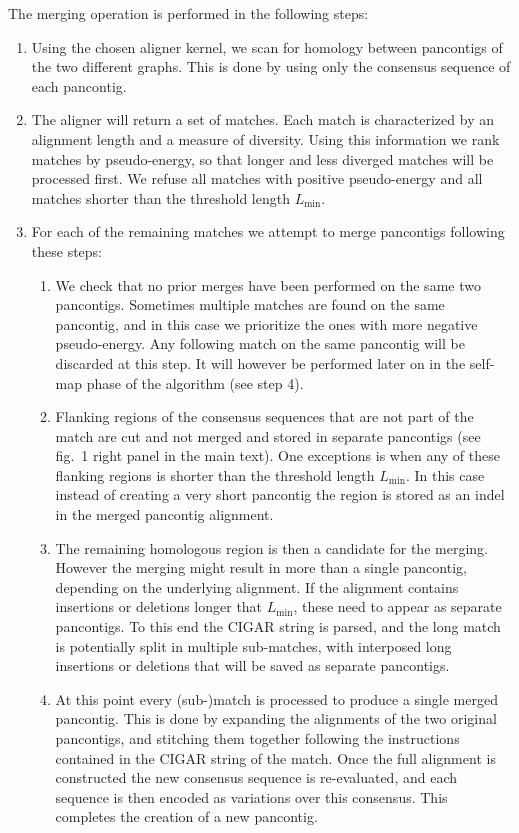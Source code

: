 \documentclass[aps,rmp,reprint,superscriptaddress,notitlepage,10pt,onecolumn]{revtex4-1}
\newcommand{\Lthr}{L_{\min}}
\begin{document}
The merging operation is performed in the following steps:
\begin{enumerate}
    \item Using the chosen aligner kernel, we scan for homology between pancontigs of the two different graphs. This is done by using only the consensus sequence of each pancontig.
    \item The aligner will return a set of matches. Each match is characterized by an alignment length and a measure of diversity. Using this information we rank matches by pseudo-energy, so that longer and less diverged matches will be processed first. We refuse all matches with positive pseudo-energy and all matches shorter than the threshold length $\Lthr$.
    \item For each of the remaining matches we attempt to merge pancontigs following these steps:
          \begin{enumerate}
              \item We check that no prior merges have been performed on the same two pancontigs. Sometimes multiple matches are found on the same pancontig, and in this case we prioritize the ones with more negative pseudo-energy. Any following match on the same pancontig will be discarded at this step. It will however be performed later on in the self-map phase of the algorithm (see step 4).
              \item Flanking regions of the consensus sequences that are not part of the match are cut and not merged and stored in separate pancontigs (see fig.~1 right panel in the main text). One exceptions is when any of these flanking regions is shorter than the threshold length $\Lthr$. In this case instead of creating a very short pancontig the region is stored as an indel in the merged pancontig alignment.
              \item The remaining homologous region is then a candidate for the merging. However the merging might result in more than a single pancontig, depending on the underlying alignment. If the alignment contains insertions or deletions longer that $\Lthr$, these need to appear as separate pancontigs. To this end the CIGAR string is parsed, and the long match is potentially split in multiple sub-matches, with interposed long insertions or deletions that will be saved as separate pancontigs.
              \item At this point every (sub-)match is processed to produce a single merged pancontig. This is done by expanding the alignments of the two original pancontigs, and stitching them together following the instructions contained in the CIGAR string of the match. Once the full alignment is constructed the new consensus sequence is re-evaluated, and each sequence is then encoded as variations over this consensus. This completes the creation of a new pancontig.

\end{enumerate}
\end{enumerate}
\end{document}

